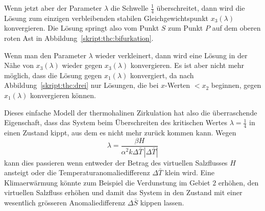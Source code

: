 Wenn jetzt aber der Parameter $\lambda$ die Schwelle $\frac14$
überschreitet, dann wird die Lösung zum einzigen verbleibenden
stabilen Gleichgewichtspunkt $x_3(\lambda)$ konvergieren.
Die Lösung springt also vom Punkt $S$ zum Punkt $P$ auf dem oberen roten Ast
in Abbildung~\ref{skript:thc:bifurkation}.

Wenn man den Parameter $\lambda$ wieder verkleinert, dann wird
eine Lösung in der Nähe von $x_3(\lambda)$ wieder gegen
$x_3(\lambda)$ konvergieren.
Es ist aber nicht mehr möglich, dass die Lösung gegen $x_1(\lambda)$
konvergiert, da nach Abbildung~\ref{skript:thc:drei} nur Lösungen,
die bei $x$-Werten $<x_2$ beginnen, gegen $x_1(\lambda)$ konvergieren
können.

Dieses einfache Modell der thermohalinen Zirkulation hat also die
überraschende Eigenschaft, dass das System beim Überschreiten des
kritischen Wertes $\lambda=\frac14$ in einen Zustand kippt, aus dem
es nicht mehr zurück kommen kann.
Wegen
\[
\lambda
=
\frac{\beta H}{\alpha^2k\Delta\bar T\,|\Delta\bar T|}
\]
kann dies passieren wenn entweder der Betrag des virtuellen Salzflusses 
$H$ ansteigt oder die Temperaturanomaliedifferenz $\Delta\bar T$
klein wird.
Eine Klimaerwärmung könnte zum Beispiel die Verdunstung im Gebiet $2$
erhöhen, den virtuellen Salzfluss erhöhen und damit das System
in den Zustand mit einer wesentlich grösseren Anomaliedifferenz
$\Delta\bar S$ kippen lassen.





